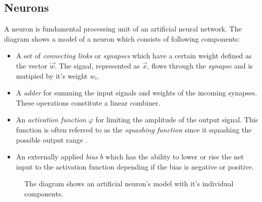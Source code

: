 \subsection{Neurons}

A neuron is fundamental processing unit of an artificial neural network. The diagram \label{fig:neuron} shows a model \cite{Haykin:1998:NNC:521706} of a neuron which consists of following components:
\begin{itemize}
  \item A set of \textit{connecting links} or \textit{synapses} which have a certain weight defined as the vector $\vec{w}$. The signal, represented as $\vec{x}$, flows through the \textit{synapse} and is mutipied by it's weight $w_i$.
  \item A \textit{adder} for summing the input signals and weights of the incoming synapses. These operations constitute a linear combiner.
  \item An \textit{activation function} $\varphi$ for limiting the amplitude of the output signal. This function is often referred to as the \textit{squashing function} since it squashing the possible output range \cite{Haykin:1998:NNC:521706}.
  \item An externally applied \textit{bias} $b$ which has the ability to lower or rise the net input to the activation function depending if the bias is negative or positive.
\end{itemize}
\begin{figure}[h]
	\centering
  \caption{The diagram shows an artificial neuron's model with it's individual components.}\label{fig:neuron}
\end{figure}

